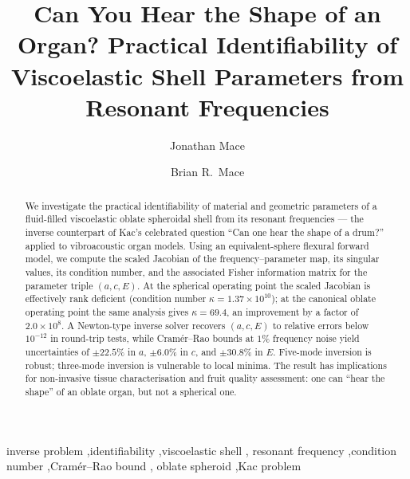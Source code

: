 \documentclass[review]{elsarticle}
\begin{document}
\begin{frontmatter}

\title{Can You Hear the Shape of an Organ? Practical Identifiability of
Viscoelastic Shell Parameters from Resonant Frequencies}

\author[msr]{Jonathan Mace}

\author[auckland]{Brian R.\ Mace}



\begin{abstract}
We investigate the practical identifiability of material and geometric
parameters of a fluid-filled viscoelastic oblate spheroidal shell from its
resonant frequencies --- the inverse counterpart of Kac's celebrated question
``Can one hear the shape of a drum?'' applied to vibroacoustic organ models.
Using an equivalent-sphere flexural forward model, we compute the scaled
Jacobian of the frequency--parameter map, its singular values, its condition
number, and the associated Fisher information matrix for the parameter triple
$(a,c,E)$.  At the spherical operating point the scaled Jacobian is
effectively rank deficient (condition number $\kappa = 1.37 \times 10^{10}$);
at the canonical oblate operating point the same analysis gives
$\kappa = 69.4$, an improvement by a factor of $2.0 \times 10^{8}$.  A
Newton-type inverse solver recovers $(a,c,E)$ to relative errors below
$10^{-12}$ in round-trip tests, while Cram\'er--Rao bounds at $1\%$ frequency
noise yield uncertainties of $\pm 22.5\%$ in $a$, $\pm 6.0\%$ in $c$, and
$\pm 30.8\%$ in $E$.  Five-mode inversion is robust; three-mode inversion is
vulnerable to local minima.  The result has implications for non-invasive
tissue characterisation and fruit quality assessment: one can ``hear the
shape'' of an oblate organ, but not a spherical one.
\end{abstract}

\begin{keyword}
inverse problem \sep identifiability \sep viscoelastic shell \sep
resonant frequency \sep condition number \sep Cram\'er--Rao bound \sep
oblate spheroid \sep Kac problem
\end{keyword}

\end{frontmatter}
\end{document}
